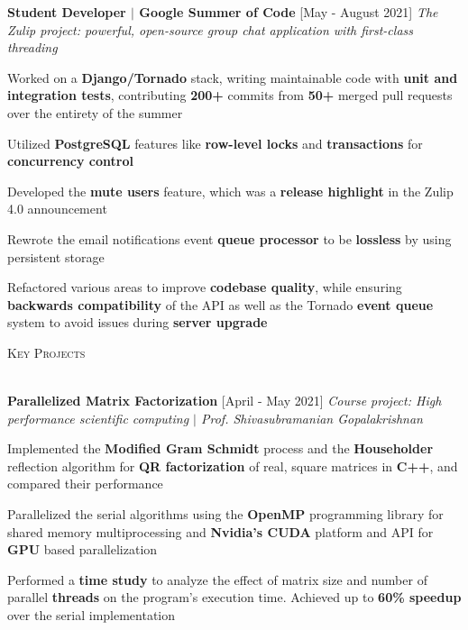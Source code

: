 \documentclass[12pt]{article}
\renewcommand{\section}[1]{
    \vspace*{10pt}
    \textsc{\Large{#1}}
    \vspace*{-10pt} \\ \hspace*{-5pt} 
    \hrulefill \\
    \vspace*{-15pt}
}
\newcommand{\smallbullet}{
    \small$\bullet$
}
\newcommand{\bigblock}[3]{
    {
        \hspace*{-8pt} \textbf{#1} \hfill #2 \newline
        \textit{#3}
    }
}
\newenvironment{bullet-list-minor}{
    \begin{list}{
        \smallbullet
    }{
        \setlength\leftmargin{30pt}\topsep 0pt \itemsep -3pt
    }
} {
    \end{list}
}
\begin{document}
    \bigblock{
        Student Developer \(|\) Google Summer of Code
    }{
        [May - August 2021]
    }{
        The Zulip project: powerful, open-source group chat application with first-class threading
    }
    \begin{bullet-list-minor}
        \item Worked on a \textbf{Django/Tornado} stack, writing maintainable code with \textbf{unit and integration tests},
        contributing \textbf{200+} commits from \textbf{50+} merged pull requests over the entirety of the summer
        \item Utilized \textbf{PostgreSQL} features like \textbf{row-level locks} and \textbf{transactions} for \textbf{concurrency control}
        \item Developed the \textbf{mute users} feature, which was a \textbf{release highlight} in the Zulip 4.0 announcement
        \item Rewrote the email notifications event \textbf{queue processor} to be \textbf{lossless} by using persistent storage
        \item Refactored various areas to improve \textbf{codebase quality}, while ensuring \textbf{backwards compatibility}
        of the API as well as the Tornado \textbf{event queue} system to avoid issues during \textbf{server upgrade}
    \end{bullet-list-minor}


    \section{Key Projects}

    \bigblock{
        Parallelized Matrix Factorization
    }{
        [April - May 2021]
    }{
        Course project: High performance scientific computing \(|\) Prof. Shivasubramanian Gopalakrishnan
    }
	\begin{bullet-list-minor}
        \item Implemented the \textbf{Modified Gram Schmidt} process and the \textbf{Householder} reflection algorithm for
        \textbf{QR factorization} of real, square matrices in \textbf{C++}, and compared their performance
        \item Parallelized the serial algorithms using the \textbf{OpenMP} programming library for shared memory
        multiprocessing and \textbf{Nvidia's CUDA} platform and API for \textbf{GPU} based parallelization
        \item Performed a \textbf{time study} to analyze the effect of matrix size and number of parallel \textbf{threads} on
        the program's execution time. Achieved up to \textbf{60\% speedup} over the serial implementation
    \end{bullet-list-minor}
    
\end{document}
